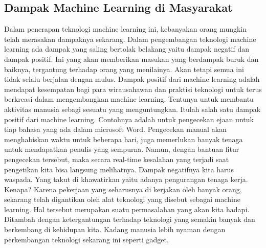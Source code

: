 \subsection{Dampak Machine Learning di Masyarakat}  
Dalam penerapan teknologi machine learning ini, kebanyakan orang mungkin telah merasakan dampaknya sekarang. Dalam pengembangan teknologi machine learning ada dampak yang saling bertolak belakang yaitu dampak negatif dan dampak positif. Ini yang akan memberikan masukan yang berdampak buruk dan baiknya, tergantung terhadap orang yang menilainya. Akan tetapi semua ini tidak selalu berjalan dengan mulus.
Dampak positif dari machine learning adalah mendapat kesempatan bagi para wirausahawan dan praktisi teknologi untuk terus berkreasi dalam mengembangkan machine learning. Tentunya untuk membantu aktivitas manusia sebagi sesuatu yang menguntungkan. Itulah salah satu dampak positif dari machine learning. Contohnya adalah untuk pengecekan ejaan untuk tiap bahasa yang ada dalam microsoft Word.
Pengecekan manual akan menghabiskan waktu untuk beberapa hari, juga memerlukan banyak tenaga untuk mendapatkan penulis yang sempurna. Namun, dengan bantuan fitur pengecekan tersebut, maka secara real-time kesalahan yang terjadi saat pengetikan kita bisa langsung melihatnya.
Dampak negatifnya kita harus waspada. Yang takut di khawatirkan yaitu adanya pengurangan tenaga kerja. Kenapa? Karena pekerjaan yang seharusnya di kerjakan oleh banyak orang, sekarang telah digantikan oleh alat teknologi yang disebut sebagai machine learning. Hal tersebut merupakan suatu permasalahan yang akan kita hadapi. Ditambah dengan ketergantungan terhadap teknologi yang semakin banyak dan berkembang di kehidupan kita. Kadang manusia lebih nyaman dengan perkembangan teknologi sekarang ini seperti gadget.


